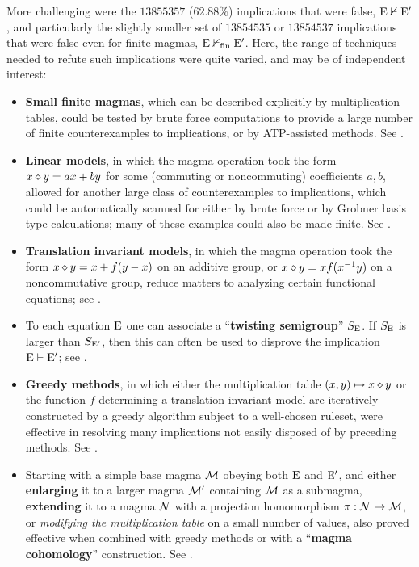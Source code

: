 More challenging were the $\num{13855357}$ ($62.88\%$) implications that were false, $\mathrm{E} \nvdash {\mathrm{E}'}$, and particularly the slightly smaller set of $\num{13854535}$ or $\num{13854537}$ implications that were false even for finite magmas, $\mathrm{E} \nvdash_{\mathrm{fin}} {\mathrm{E}'}$. Here, the range of techniques needed to refute such implications were quite varied, and may be of independent interest:
\begin{itemize}
        \item \textbf{Small finite magmas}, which can be described explicitly by multiplication tables, could be tested by brute force computations to provide a large number of finite counterexamples to implications, or by ATP-assisted methods. See .
        \item \textbf{Linear models}, in which the magma operation took the form $x \diamond y = ax + by$ for some (commuting or noncommuting) coefficients $a,b$, allowed for another large class of counterexamples to implications, which could be automatically scanned for either by brute force or by Grobner basis type calculations; many of these examples could also be made finite. See .
        \item \textbf{Translation invariant models}, in which the magma operation took the form $x \diamond y = x + f(y-x)$ on an additive group, or $x \diamond y = x f(x^{-1} y)$ on a noncommutative group, reduce matters to analyzing certain functional equations; see .
        \item To each equation $\mathrm{E}$ one can associate a ``\textbf{twisting semigroup}'' $S_{\mathrm{E}}$.  If $S_{\mathrm{E}}$ is larger than $S_{{\mathrm{E}'}}$, then this can often be used to disprove the implication ${\mathrm{E}} \vdash {\mathrm{E}'}$; see .
        \item \textbf{Greedy methods}, in which either the multiplication table $(x,y) \mapsto x \diamond y$ or the function $f$ determining a translation-invariant model are iteratively constructed by a greedy algorithm subject to a well-chosen ruleset, were effective in resolving many implications not easily disposed of by preceding methods. See .
        \item Starting with a simple base magma ${\mathcal{M}}$ obeying both $\mathrm{E}$ and ${\mathrm{E}'}$, and either \textbf{enlarging} it to a larger magma ${\mathcal{M}}'$ containing ${\mathcal{M}}$ as a submagma, \textbf{extending} it to a magma ${\mathcal{N}}$ with a projection homomorphism $\pi: {\mathcal{N}} \to {\mathcal{M}}$, or \emph{modifying the multiplication table} on a small number of values, also proved effective when combined with greedy methods or with a ``\textbf{magma cohomology}'' construction. See .

\end{itemize}
